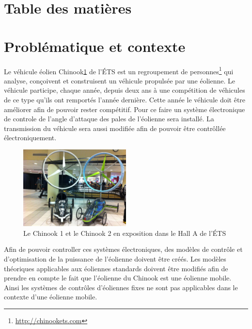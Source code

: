 \documentclass[11pt]{article}
\begin{document}
\section*{Table des matières}

\renewcommand{\contentsname}{Table des matières}
\makeatletter
\renewcommand{\tableofcontents}{%
}
\makeatother

\tableofcontents


\listoffigures
{}


\clearpage

\section{Problématique et contexte}

Le véhicule éolien Chinook\ref{fig:chinookHall} de l'ÉTS est un regroupement de personnes\footnote{\url{http://chinookets.com}} qui analyse, conçoivent et construisent un véhicule propulsée par une éolienne. Le véhicule participe, chaque année, depuis deux ans à une compétition de véhicules de ce type qu'ils ont remportés l'année dernière. Cette année le véhicule doit être améliorer afin de pouvoir rester compétitif. Pour ce faire un système électronique de controle de l'angle d'attaque des pales de l'éolienne sera installé. La transmission du véhicule sera aussi modifiée afin de pouvoir être contrôllée électroniquement. 

\begin{figure}[H]
  \centering
  \includegraphics[width=0.5\textwidth]{images/chinook_1_et_2.jpg}
  \caption[Chinook 1 et 2]{Le Chinook 1 et le Chinook 2 en exposition dans le Hall A de l'ÉTS}
  \label{fig:chinookHall}
\end{figure}

Afin de pouvoir controller ces systèmes électroniques, des modèles de contrôle et d'optimisation de la puissance de l'éolienne doivent être créés. Les modèles théoriques applicables aux éoliennes standards doivent être modifiés afin de prendre en compte le fait que l'éolienne du Chinook est une éolienne mobile. Ainsi les systèmes de contrôles d'éoliennes fixes ne sont pas applicables dans le contexte d'une éolienne mobile.
\end{document}
